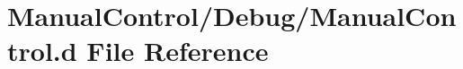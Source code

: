 \hypertarget{_manual_control_8d}{}\section{Manual\+Control/\+Debug/\+Manual\+Control.d File Reference}
\label{_manual_control_8d}
